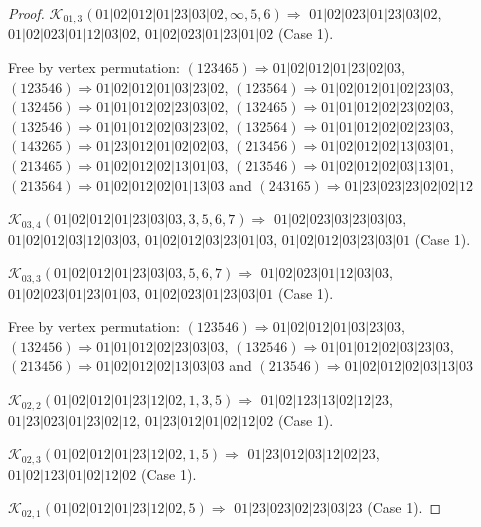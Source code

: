\documentclass[12pt]{article}
\theoremstyle{plain}
\theoremstyle{definition}
\theoremstyle{remark}
\newcommand{\fancy}[1]{\mathcal{#1}}
\def\K{\fancy{K}}
\begin{document}
\begin{proof}
	$\K_{01,3}(01|02|012|01|23|03|02,\infty,5, 6)\Rightarrow $ $01|02|023|01|23|03|02$, $01|02|023|01|12|03|02$, $01|02|023|01|23|01|02$ (Case 1).
	
	
	
	Free by vertex permutation: $(1 2 3 4 6 5)\Rightarrow 01|02|012|01|23|02|03$, $(1 2 3 5 4 6)\Rightarrow 01|02|012|01|03|23|02$, $(1 2 3 5 6 4)\Rightarrow 01|02|012|01|02|23|03$, $(1 3 2 4 5 6)\Rightarrow 01|01|012|02|23|03|02$, $(1 3 2 4 6 5)\Rightarrow 01|01|012|02|23|02|03$, $(1 3 2 5 4 6)\Rightarrow 01|01|012|02|03|23|02$, $(1 3 2 5 6 4)\Rightarrow 01|01|012|02|02|23|03$, $(1 4 3 2 6 5)\Rightarrow 01|23|012|01|02|02|03$, $(2 1 3 4 5 6)\Rightarrow 01|02|012|02|13|03|01$, $(2 1 3 4 6 5)\Rightarrow 01|02|012|02|13|01|03$, $(2 1 3 5 4 6)\Rightarrow 01|02|012|02|03|13|01$, $(2 1 3 5 6 4)\Rightarrow 01|02|012|02|01|13|03$ and $(2 4 3 1 6 5)\Rightarrow 01|23|023|23|02|02|12$
	
	
	
	\bigskip
	
	$\K_{03,4}(01|02|012|01|23|03|03,3, 5, 6, 7)\Rightarrow $ $01|02|023|03|23|03|03$, $01|02|012|03|12|03|03$, $01|02|012|03|23|01|03$, $01|02|012|03|23|03|01$ (Case 1).
	
	$\K_{03,3}(01|02|012|01|23|03|03,5, 6, 7)\Rightarrow $ $01|02|023|01|12|03|03$, $01|02|023|01|23|01|03$, $01|02|023|01|23|03|01$ (Case 1).
	
	
	
	Free by vertex permutation: $(1 2 3 5 4 6)\Rightarrow 01|02|012|01|03|23|03$, $(1 3 2 4 5 6)\Rightarrow 01|01|012|02|23|03|03$, $(1 3 2 5 4 6)\Rightarrow 01|01|012|02|03|23|03$, $(2 1 3 4 5 6)\Rightarrow 01|02|012|02|13|03|03$ and $(2 1 3 5 4 6)\Rightarrow 01|02|012|02|03|13|03$
	
	
	
	\bigskip
	
	$\K_{02,2}(01|02|012|01|23|12|02,1, 3, 5)\Rightarrow $ $01|02|123|13|02|12|23$, $01|23|023|01|23|02|12$, $01|23|012|01|02|12|02$ (Case 1).
	
	$\K_{02,3}(01|02|012|01|23|12|02,1, 5)\Rightarrow $ $01|23|012|03|12|02|23$, $01|02|123|01|02|12|02$ (Case 1).
	
	$\K_{02,1}(01|02|012|01|23|12|02,5)\Rightarrow $ $01|23|023|02|23|03|23$ (Case 1).
	
	
	

\end{proof}
\end{document}

